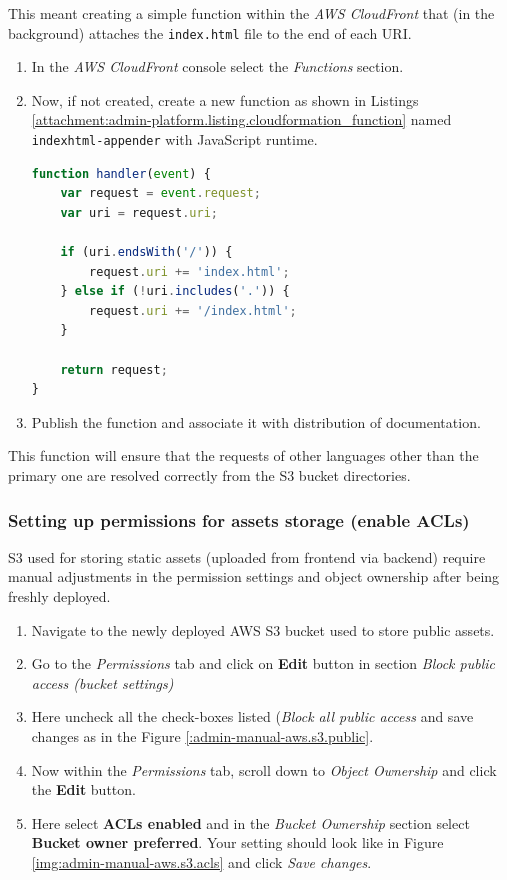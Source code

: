 This meant creating a simple function within the \textit{AWS CloudFront} that (in the background) attaches the \texttt{index.html} file to the end of each URI.

\begin{enumerate}
    \item In the \textit{AWS CloudFront} console select the \textit{Functions} section.
    \item Now, if not created, create a new function as shown in Listings \ref{attachment:admin-platform.listing.cloudformation_function}  named \texttt{indexhtml-appender} with JavaScript runtime.
\begin{lstlisting}[language=javascript,caption={AWS CloudFront function to  append \texttt{index.html} to each URI}]
function handler(event) {
    var request = event.request;
    var uri = request.uri;

    if (uri.endsWith('/')) {
        request.uri += 'index.html';
    } else if (!uri.includes('.')) {
        request.uri += '/index.html';
    }

    return request;
}
\end{lstlisting}
\label{attachment:admin-platform.listing.cloudformation_function}
\item Publish the function and associate it with distribution of documentation.
\end{enumerate}

This function will ensure that the requests of other languages other than the primary one are resolved correctly from the \ac{S3} bucket directories.

\subsubsection{Setting up permissions for assets storage (enable ACLs)}
\label{attachments:admin-manual-aws.s3.permissions}
\ac{S3} used for storing static assets (uploaded from frontend via backend) require manual adjustments in the permission settings and object ownership after being freshly deployed.

\begin{enumerate}
    \item Navigate to the newly deployed AWS \ac{S3} bucket used to store public assets.
    \item Go to the \textit{Permissions} tab and click on \textbf{Edit} button in section \textit{Block public access (bucket settings)}
    \item Here uncheck all the check-boxes listed (\textit{Block all public access} and save changes as in the Figure \ref{:admin-manual-aws.s3.public}.
    \item Now within the \textit{Permissions} tab, scroll down to \textit{Object Ownership} and click the \textbf{Edit} button. 
    \item Here select \textbf{ACLs enabled} and in the \textit{Bucket Ownership} section select \textbf{Bucket owner preferred}. Your setting should look like in Figure \ref{img:admin-manual-aws.s3.acls} and click \textit{Save changes}.
\end{enumerate}

